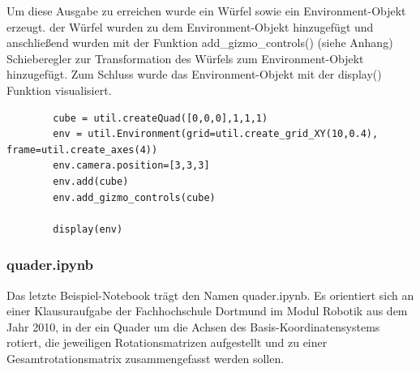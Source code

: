 Um diese Ausgabe zu erreichen wurde ein Würfel sowie ein Environment-Objekt erzeugt. der Würfel wurden zu dem Environment-Objekt
hinzugefügt und anschließend wurden mit der Funktion add\_gizmo\_controls() (siehe Anhang) Schieberegler zur Transformation des Würfels zum Environment-Objekt
hinzugefügt. Zum Schluss wurde das Environment-Objekt mit der display() Funktion visualisiert.

\begin{center}
    \begin{verbatim}
        cube = util.createQuad([0,0,0],1,1,1)
        env = util.Environment(grid=util.create_grid_XY(10,0.4), frame=util.create_axes(4))
        env.camera.position=[3,3,3]
        env.add(cube)
        env.add_gizmo_controls(cube)
        
        display(env)
    \end{verbatim}
\end{center}


\subsubsection{quader.ipynb}
Das letzte Beispiel-Notebook trägt den Namen quader.ipynb.
Es orientiert sich an einer Klausuraufgabe der Fachhochschule Dortmund im Modul Robotik aus dem Jahr 2010,
in der ein Quader um die Achsen des Basis-Koordinatensystems rotiert,
die jeweiligen Rotationsmatrizen aufgestellt und zu einer Gesamtrotationsmatrix zusammengefasst werden sollen.

